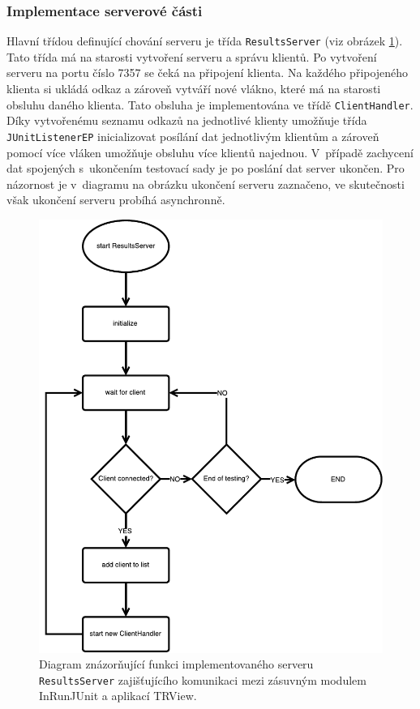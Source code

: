       \subsubsection{Implementace serverové části}
	Hlavní třídou definující chování serveru je třída \texttt{ResultsServer} (viz obrázek \ref{fig:resultsserver_flowchart}). Tato třída má na starosti vytvoření serveru a správu klientů. Po vytvoření serveru na portu číslo 7357 se čeká na připojení klienta. Na každého připojeného klienta si ukládá odkaz a zároveň vytváří nové vlákno, které má na starosti obsluhu daného klienta. Tato obsluha je implementována ve třídě \texttt{ClientHandler}. Díky vytvořenému seznamu odkazů na jednotlivé klienty umožňuje třída \texttt{JUnitListenerEP} inicializovat posílání dat jednotlivým klientům a zároveň pomocí více vláken umožňuje obsluhu více klientů najednou. V~případě zachycení dat spojených s~ukončením testovací sady je po poslání dat server ukončen. Pro názornost je v~diagramu na obrázku ukončení serveru zaznačeno, ve skutečnosti však ukončení serveru probíhá asynchronně.
	
	\begin{figure}
	  \includegraphics[width=\textwidth, height=\textheight, keepaspectratio, center]{obrazky-figures/inrunjunit_resultsserver_flowchart.pdf}
	  \caption{Diagram znázorňující funkci implementovaného serveru \texttt{ResultsServer} zajišťujícího komunikaci mezi zásuvným modulem InRunJUnit a aplikací TRView.}
	  \label{fig:resultsserver_flowchart}
	\end{figure}

